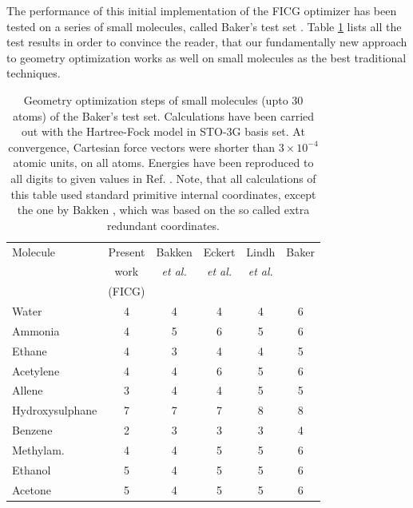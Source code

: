 \documentclass[prl,aps,twocolumn,showpacs,twocolumngrid,superbib]{revtex4}
\begin{document}
The performance of this initial implementation of the FICG optimizer
has been tested on a 
series of small molecules, called Baker's test set \cite{bakerstest}.
Table \ref{Bakers_test} lists all the test results
in order to convince
the reader, that our fundamentally new approach to geometry optimization
works as well on small molecules as the best traditional techniques.
\begin{table}[h]
\caption{
Geometry optimization steps of small molecules (upto 30 atoms)
of the Baker's test set. Calculations have been carried out 
with the Hartree-Fock model in STO-3G basis set.
At convergence, Cartesian force vectors were shorter 
than $3\times10^{-4}$ atomic units, on all atoms. Energies have been
reproduced to all digits to given values in Ref. \cite{bakerstest}.
Note, that all calculations of this table used standard primitive 
internal coordinates, except the one by Bakken \cite{bakken}, 
which was based on the so called extra redundant coordinates.
}
\label{Bakers_test}
\squeezetable
\begin{tabular}{lccccc}
\toprule
Molecule               & Present  & Bakken & Eckert  & Lindh &  Baker  \\
         & work & {\it{et al.}} & {\it{et al.}} & {\it{et al.}} &    \\
         &(FICG) &  \cite{bakken} &  \cite{eckert} & \cite{lindh} &  \cite{bakerstest} \\
\colrule
Water                  &   4    &   4    &    4    &    4   &   6     \\
Ammonia                &   4    &   5    &    6    &    5   &   6     \\
Ethane                 &   4    &   3    &    4    &    4   &   5     \\
Acetylene              &   4    &   4    &    6    &    5   &   6     \\
Allene                 &   3    &   4    &    4    &    5   &   5     \\
Hydroxysulphane        &   7    &   7    &    7    &    8   &   8     \\
Benzene                &   2    &   3    &    3    &    3   &   4     \\
Methylam.              &   4    &   4    &    5    &    5   &   6     \\
Ethanol                &   5    &   4    &    5    &    5   &   6     \\
Acetone                &   5    &   4    &    5    &    5   &   6     \\

\end{tabular}
\end{table}
\end{document}
